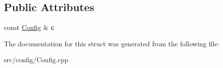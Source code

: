 \subsection*{Public Attributes}
\begin{DoxyCompactItemize}
\item 
\hypertarget{structtoTomlName_ac218bcee1d45d3e7a13da755b42bf19a}{const \hyperlink{classtheoria_1_1config_1_1Config}{Config} \& {\bfseries c}}\label{structtoTomlName_ac218bcee1d45d3e7a13da755b42bf19a}

\end{DoxyCompactItemize}


The documentation for this struct was generated from the following file\+:\begin{DoxyCompactItemize}
\item 
src/config/Config.\+cpp\end{DoxyCompactItemize}
